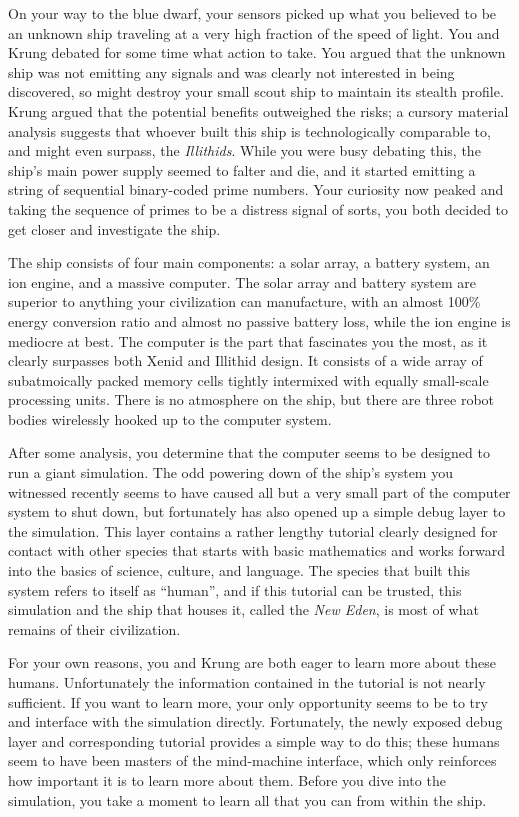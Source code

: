 \documentclass[char]{guildcamp1}
\begin{document}
On your way to the blue dwarf, your sensors picked up what you believed to be an unknown ship traveling at a very high fraction of the speed of light. You and Krung debated for some time what action to take. You argued that the unknown ship was not emitting any signals and was clearly not interested in being discovered, so might destroy your small scout ship to maintain its stealth profile. Krung argued that the potential benefits outweighed the risks; a cursory material analysis suggests that whoever built this ship is technologically comparable to, and might even surpass, the \emph{Illithids}. While you were busy debating this, the ship's main power supply seemed to falter and die, and it started emitting a string of sequential binary-coded prime numbers. Your curiosity now peaked and taking the sequence of primes to be a distress signal of sorts, you both decided to get closer and investigate the ship.

The ship consists of four main components: a solar array, a battery system, an ion engine, and a massive computer. The solar array and battery system are superior to anything your civilization can manufacture, with an almost 100\% energy conversion ratio and almost no passive battery loss, while the ion engine is mediocre at best. The computer is the part that fascinates you the most, as it clearly surpasses both Xenid and Illithid design. It consists of a wide array of subatmoically packed memory cells tightly intermixed with equally small-scale processing units. There is no atmosphere on the ship, but there are three robot bodies wirelessly hooked up to the computer system.

After some analysis, you determine that the computer seems to be designed to run a giant simulation. The odd powering down of the ship's system you witnessed recently seems to have caused all but a very small part of the computer system to shut down, but fortunately has also opened up a simple debug layer to the simulation. This layer contains a rather lengthy tutorial clearly designed for contact with other species that starts with basic mathematics and works forward into the basics of science, culture, and language. The species that built this system refers to itself as ``human'', and if this tutorial can be trusted, this simulation and the ship that houses it, called the \emph{New Eden}, is most of what remains of their civilization.

For your own reasons, you and Krung are both eager to learn more about these humans. Unfortunately the information contained in the tutorial is not nearly sufficient. If you want to learn more, your only opportunity seems to be to try and interface with the simulation directly. Fortunately, the newly exposed debug layer and corresponding tutorial provides a simple way to do this; these humans seem to have been masters of the mind-machine interface, which only reinforces how important it is to learn more about them. Before you dive into the simulation, you take a moment to learn all that you can from within the ship.
\end{document}
